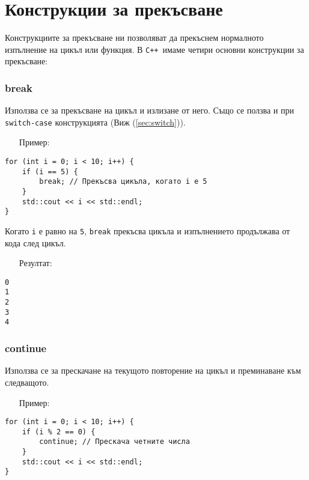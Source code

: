 \documentclass[oneside]{book}
\newcommand*{\code}[1]{\texttt{#1}}
\newcommand*{\cpp}{\texttt{C++}\ }
\begin{document}
\section{Конструкции за прекъсване}
Конструкциите за прекъсване ни позволяват да прекъснем нормалното изпълнение на цикъл или функция. В \cpp имаме четири основни конструкции за прекъсване:

\subsubsection{break}
Използва се за прекъсване на цикъл и излизане от него. Също се ползва и при \code{switch-case} конструкцията (Виж (\ref{sec:switch})).

\begin{itemize}\item[Пример:]\end{itemize}
\begin{mdframed}\begin{lstlisting}
for (int i = 0; i < 10; i++) {
    if (i == 5) {
        break; // Прекъсва цикъла, когато i е 5
    }
    std::cout << i << std::endl;
}
\end{lstlisting}\end{mdframed}

Когато \code{i} е равно на \code{5}, \code{break} прекъсва цикъла и изпълнението продължава от кода след цикъл.

\begin{itemize}\item[Резултат:]\end{itemize}
\begin{mdframed}\begin{lstlisting}[language={}]
0
1
2
3
4
\end{lstlisting}\end{mdframed}

\subsubsection{continue}
Използва се за прескачане на текущото повторение на цикъл и преминаване към следващото.

\begin{itemize}\item[Пример:]\end{itemize}
\begin{mdframed}\begin{lstlisting}
for (int i = 0; i < 10; i++) {
    if (i % 2 == 0) {
        continue; // Прескача четните числа
    }
    std::cout << i << std::endl;
}
\end{lstlisting}\end{mdframed}
\end{document}

